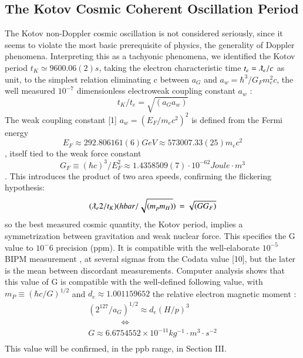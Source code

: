 \documentclass[twoside,draft]{article}
\begin{document}
\begin{sloppypar}
{\subsection{The Kotov Cosmic Coherent Oscillation Period}

The Kotov non-Doppler cosmic oscillation \cite{Lyuty} is not considered seriously, since it seems to
violate the most basic prerequisite of physics, the generality of Doppler phenomena. Interpreting
this as a tachyonic phenomena, we identified the Kotov period $t_{K} \simeq 9600.06(2) s$, taking the electron
characteristic time $t_{e} = \lambdabar_{e} /c$ as unit, to the simplest relation eliminating c between $a_{G}$ and $a_{w}=
\hbar^{3} /G_{F} m_{e}^{2} c$, the well measured $10^{-7}$ dimensionless electroweak coupling constant $a_{w}$ :
\begin{equation}
t_{K} / t_{e} = \sqrt{(a_{G} a_{w})}
\end{equation}
The weak coupling constant [1] $a_{w} = (E_{F} /m_{e} c^{2} )^{2}$ is defined from the Fermi energy 
\begin{equation}
E_{F} \approx 292.806161(6) GeV \approx 573007.33(25) m_{e} c^{2}
\end{equation}, itself tied to the weak force constant 
\begin{equation}
G_{F} \equiv (\hbar c)^{3} /E_{F}^{2} \approx
1.4358509(7) \cdot 10^{-62} Joule \cdot m^{3}
\end{equation}
\cite{Pdc}. This introduces the product of two area speeds, confirming the
flickering hypothesis:
\begin{equation}
(\lambdabar_{e} 2/t_{K} )(hbar/\sqrt{(m_{p} m_{H})})\, = \sqrt{(GG_{F})}
\end{equation}
so the best measured cosmic quantity, the Kotov period, implies a symmetrization between
gravitation and weak nuclear force. This specifies the G value to $10^-{6}$ precision (ppm). It is
compatible with the well-elaborate $10^{-5}$ BIPM measurement \cite{Quinn}, at several sigmas from the Codata
value [10], but the later is the mean between discordant measurements.
Computer analysis shows that this value of G is compatible with the well-defined following
value, with $m_{P} \equiv (\hbar c/G)^{1/2}$ and $d_{e} \approx 1.001159652$ the relative electron magnetic moment :
$$\begin{array}{ll}
(2^{127} /a_{G} )^{1/2} \approx d_{e} (H/p)^{3} \\
\qquad  \qquad \Leftrightarrow \\
G \approx 6.6754552 \times 10^{-11} kg^{-1} \cdot m^{3} \cdot s^{-2} \\
\end{array}$$
This value will be confirmed, in the ppb range, in Section III.

}
\end{sloppypar}
\end{document}
